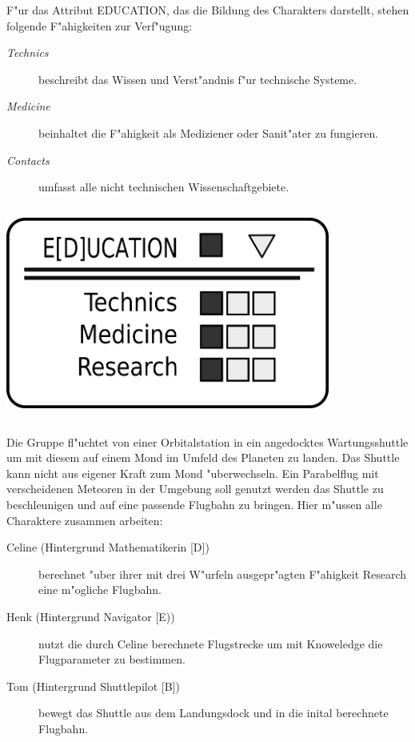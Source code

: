 \begin{column}[l]{0.55}
    F"ur das Attribut EDUCATION, das die Bildung des Charakters darstellt, stehen folgende F"ahigkeiten zur Verf"ugung:

    \begin{description}
        \item[\emph{Technics}] beschreibt das Wissen und Verst"andnis f"ur technische Systeme.
        \item[\emph{Medicine}] beinhaltet die F"ahigkeit als Mediziener oder Sanit"ater zu fungieren.
        \item[\emph{Contacts}] umfasst alle nicht technischen Wissenschaftgebiete.
    \end{description}
\end{column}
\begin{column}[r]{0.45}
    \centering
    \includegraphics[width=0.80\textwidth]{images/character_education.png}
\end{column}

\medskip
\begin{ruleexample}
    Die Gruppe fl"uchtet von einer Orbitalstation in ein angedocktes Wartungsshuttle um mit diesem auf einem Mond im Umfeld des Planeten zu landen. Das Shuttle kann nicht aus eigener Kraft zum Mond "uberwechseln. Ein Parabelflug mit verscheidenen Meteoren in der Umgebung soll genutzt werden das Shuttle zu beschleunigen und auf eine passende Flugbahn zu bringen. Hier m"ussen alle Charaktere zusammen arbeiten:

\begin{description}
        \item[Celine ({Hintergrund Mathematikerin [D]})] berechnet "uber ihrer mit drei W"urfeln ausgepr"agten F"ahigkeit Research eine 
            m"ogliche Flugbahn.
        \item[Henk ({Hintergrund Navigator [E)})] nutzt die durch Celine berechnete Flugstrecke um mit Knoweledge die Flugparameter zu 
            bestimmen.
        \item[Tom ({Hintergrund Shuttlepilot [B]})] bewegt das Shuttle aus dem Landungsdock und in die inital berechnete Flugbahn.
    \end{description}
\end{ruleexample}

